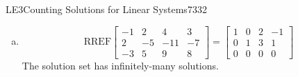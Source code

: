 \begin{exercise}{LE3}{Counting Solutions for Linear Systems}{7332}
\begin{exerciseAnswer}
\begin{enumerate}[(a)]
 
\item  

 \[\mathrm{RREF}\left[\begin{array}{ccc|c}
-1 & 2 & 4 & 3 \\
2 & -5 & -11 & -7 \\
-3 & 5 & 9 & 8
\end{array}\right]=\left[\begin{array}{ccc|c}
1 & 0 & 2 & -1 \\
0 & 1 & 3 & 1 \\
0 & 0 & 0 & 0
\end{array}\right]\] The solution set has infinitely-many solutions. 

 
\end{enumerate}

     \end{exerciseAnswer}
 \end{exercise}


